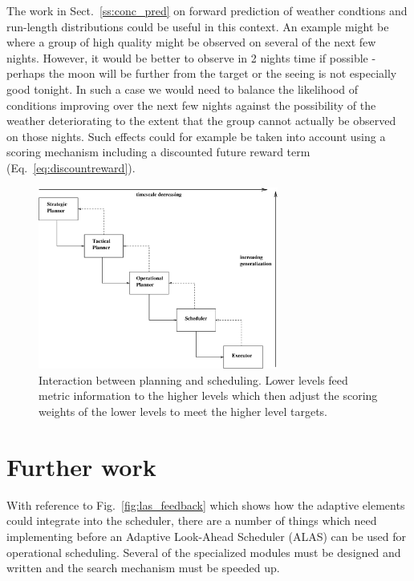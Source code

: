  The work in Sect.~\ref{ss:conc_pred} on forward prediction of weather condtions and run-length distributions could be useful in this context. An example might be where a group of high quality might be observed on several of the next few nights. However, it would be better to observe in 2 nights time if possible - perhaps the moon will be further from the target or the seeing is not especially good tonight. In such a case we would need to balance the likelihood of conditions improving over the next few nights against the possibility of the weather deteriorating to the extent that the group cannot actually be observed on those nights. Such effects could for example be taken into account using a scoring mechanism including a discounted future reward term (Eq.~\ref{eq:discountreward}). 

   \begin{figure}[htp]
   \begin{center}
   \includegraphics[height=6cm]{figures/plan_sched.eps}
   \end{center}
   \caption[Interaction between planning and scheduling.] 
   {Interaction between planning and scheduling. Lower levels feed metric information to the higher levels which then adjust the scoring weights of the lower levels to meet the higher level targets.}
   \label{fig:plan_sched} 
   \end{figure} 

\section{Further work}
\label{sect:further}

With reference to Fig.~\ref{fig:las_feedback} which shows how the adaptive elements could integrate into the scheduler, there are a number of things which need implementing before an Adaptive Look-Ahead Scheduler (ALAS) can be used for operational scheduling. Several of the specialized modules must be designed and written and the search mechanism must be speeded up.


